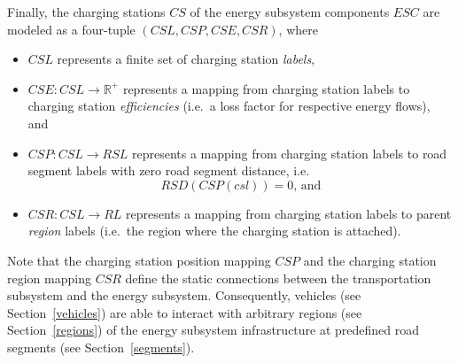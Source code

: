 Finally, the charging stations $CS$ of the energy subsystem components $ESC$ are modeled as a four-tuple $(CSL, CSP, CSE, CSR)$, where
\begin{itemize}
	\item $CSL$ represents a finite set of charging station \textit{labels},
	\item $CSE: CSL \rightarrow \mathbb{R}^+$ represents a mapping from charging station labels to charging station \textit{efficiencies} (i.e.\ a loss factor for respective energy flows), and
	\item $CSP: CSL \rightarrow RSL$ represents a mapping from charging station labels to road segment labels with zero road segment distance, i.e.\
	\[
		RSD(CSP(csl)) = 0 \textrm{, and}
	\]
	\item $CSR: CSL \rightarrow RL$ represents a mapping from charging station labels to parent \textit{region} labels (i.e.\ the region where the charging station is attached).
\end{itemize}
Note that the charging station position mapping $CSP$  and the charging station region mapping $CSR$ define the static connections between the transportation subsystem and the energy subsystem. Consequently, vehicles (see Section~\ref{vehicles}) are able to interact with arbitrary regions (see Section~\ref{regions}) of the energy subsystem infrastructure at predefined road segments (see Section~\ref{segments}).
